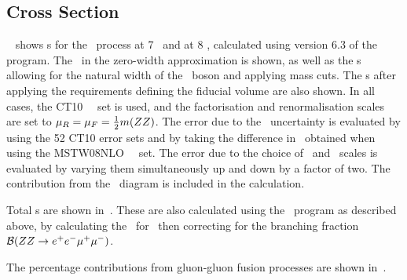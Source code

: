 \subsection{Cross Section}

~ shows \cx s for the \ZZeemm\ process at 7 \tev\ and
at 8 \tev, calculated using version 6.3 of the
\mcfm~\cite{Campbell:2011} program. The \cx\  in the zero-width approximation is shown, as
well as the \cx s allowing for the natural width of the \Z\ boson and
applying mass cuts.  The \cx s after applying the requirements defining
the fiducial volume are also shown. 
In all cases, the CT10~\cite{CT10} \partDF\ set is used, and the factorisation and renormalisation scales are set
to $\mu_{R} = \mu_{F} = \frac{1}{2} m(ZZ)$. The error due to the \partDF\ 
uncertainty is
evaluated by using the 52 CT10 error sets and by taking the difference in \cx\ 
obtained when using the MSTW08NLO~\cite{bib:MSTW2008} \partDF\ set. The error 
due to the choice of
\fact\ and \renorm\ scales is evaluated by varying them
simultaneously up and down by a factor of two. The contribution from the
\gammas\ diagram is included in the calculation.

Total \cx s are shown in~. These are also
calculated using the \mcfm\ program as described above, by
calculating the \cx\  for \ZZeemm\ then correcting for the branching
fraction $\mathcal{B}(ZZ\rightarrow e^{+}e^{-}\mu^{+}\mu^{-})$. 

The percentage contributions from
gluon-gluon fusion processes are shown in~.


